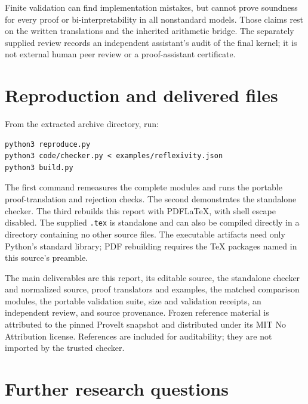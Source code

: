 \documentclass[11pt,letterpaper]{article}
\theoremstyle{definition}\newtheorem{definition}[theorem]{Definition}
\begin{document}
Finite validation can find implementation mistakes, but cannot prove
soundness for every proof or bi-interpretability in all nonstandard models.
Those claims rest on the written translations and the inherited arithmetic
bridge. The separately supplied review records an independent assistant's
audit of the final kernel; it is not external human peer review or a
proof-assistant certificate.

\section{Reproduction and delivered files}

From the extracted archive directory, run:
\begin{lstlisting}
python3 reproduce.py
python3 code/checker.py < examples/reflexivity.json
python3 build.py
\end{lstlisting}
The first command remeasures the complete modules and runs the portable
proof-translation and rejection checks. The second demonstrates the
standalone checker. The third rebuilds this report with PDFLaTeX, with
shell escape disabled. The supplied \texttt{.tex} is standalone and can
also be compiled directly in a directory containing no other source files.
The executable artifacts need only Python's standard library; PDF rebuilding
requires the TeX packages named in this source's preamble.

The main deliverables are this report, its editable source, the standalone
checker and normalized source, proof translators and examples, the matched
comparison modules, the portable validation suite, size and validation
receipts, an independent review, and source provenance. Frozen reference
material is attributed to the pinned ProveIt snapshot and distributed under
its MIT No Attribution license. References are included for auditability;
they are not imported by the trusted checker.

\section{Further research questions}
\end{document}
